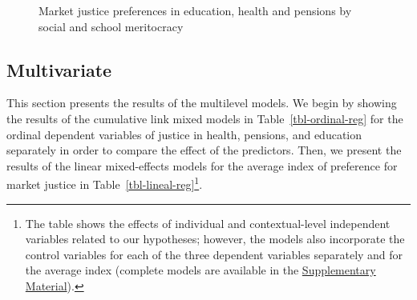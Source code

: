 \documentclass[
    behavsci,
    article,
    submit,
moreauthors
]{mdpi}
\begin{document}
\begin{figure}


\caption{\label{fig-bivariate}Market justice preferences in education,
health and pensions by social and school meritocracy}

\end{figure}%

\subsection{Multivariate}\label{multivariate}

This section presents the results of the multilevel models. We begin by
showing the results of the cumulative link mixed models in
Table~\ref{tbl-ordinal-reg} for the ordinal dependent variables of
justice in health, pensions, and education separately in order to
compare the effect of the predictors. Then, we present the results of
the linear mixed-effects models for the average index of preference for
market justice in Table~\ref{tbl-lineal-reg}\footnote{The table shows
  the effects of individual and contextual-level independent variables
  related to our hypotheses; however, the models also incorporate the
  control variables for each of the three dependent variables separately
  and for the average index (complete models are available in the
  \hyperref[appendix]{Supplementary Material}).}.
\end{document}
